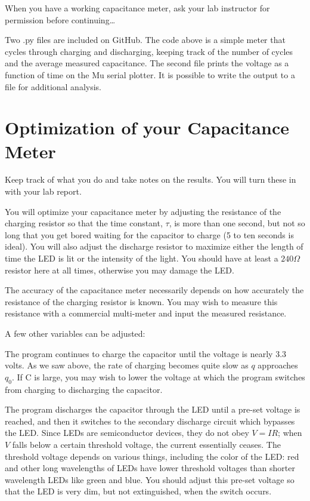 \documentclass[]{article}
\begin{document}
When you have a working capacitance meter, ask your lab instructor for permission before continuing\dots 

Two .py files are included on GitHub. The code above is a simple meter that cycles through charging and discharging, keeping track of the number of cycles and the average measured capacitance.  The second file prints the voltage as a function of time on the Mu serial plotter.  It is possible to write the output to a file for additional analysis.

\section{Optimization of your Capacitance Meter}

Keep track of what you do and take notes on the results.  You will turn these in with your lab report.

You will  optimize your capacitance meter by adjusting the resistance of the charging resistor so that the time constant, $\tau$, is more than one second, but not so long that you get bored waiting for the capacitor  to charge (5 to ten seconds is ideal).  You will also adjust the discharge resistor to maximize either the length of time the LED is lit or the intensity of the light.  You should have at least a $240 \Omega$ resistor here at all times, otherwise you may damage the LED.

The accuracy of the capacitance meter necessarily depends on how accurately the resistance of the charging resistor is known.  You may wish to measure this resistance with a commercial multi-meter and input the measured resistance.  

A few other variables can be adjusted:  

The program continues to charge the capacitor until the voltage is nearly 3.3 volts.   As we saw above, the rate of charging becomes quite slow as $q$ approaches $q_0$.  If C is large, you may wish to lower the voltage at which the program switches from charging to discharging the capacitor.

The program discharges the capacitor through the LED until a pre-set voltage is reached, and then it switches to the secondary discharge circuit which bypasses the LED.  Since LEDs are semiconductor devices, they do not obey $V=IR$; when $V$ falls below a certain threshold voltage, the current essentially ceases.  The threshold voltage depends on various things, including the color of the LED: red and other long wavelengths of LEDs have lower threshold voltages than shorter wavelength LEDs like green and blue.  You should adjust this pre-set voltage so that the LED is very dim, but not extinguished, when the switch occurs.
\end{document}

